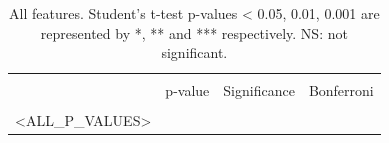 \documentclass[]{article}
\begin{document}
    \newpage

    \begin{longtable}{ c c c c }
    \caption{All features. Student's t-test p-values < 0.05, 0.01, 0.001 are represented by *, ** and 
    *** respectively. NS: not significant.} \label{tab:long} \\
    \hline \\
        & p-value & Significance & Bonferroni \\
    \hline \\
    \endfirsthead
    \endhead
    <ALL_P_VALUES>   
    \end{longtable}
\end{document}
